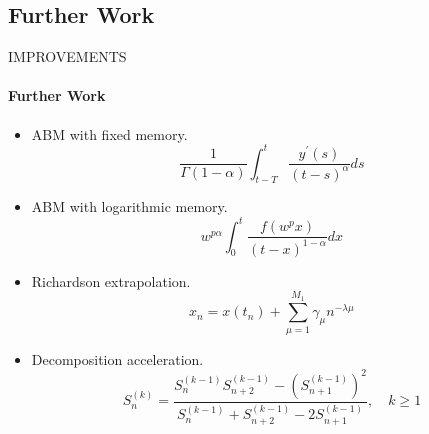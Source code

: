 \subsection{Further Work}
\begin{frame}{IMPROVEMENTS}
\framesubtitle{Further Work}
\begin{itemize}
    \item ABM with fixed memory.
    \[\frac { 1 } { \Gamma ( 1 - \alpha ) } \int _ { t - T } ^ { t } \frac { y ^ { \prime } ( s ) } { ( t - s ) ^ { \alpha } } d s\]
    \item ABM with logarithmic memory.
    \[w ^ { p \alpha } \int _ { 0 } ^ { t } \frac { f \left( w ^ { p } x \right) } { ( t - x ) ^ { 1 - \alpha } } d x\]
    \item Richardson extrapolation.
    \[x _ { n } = x \left( t _ { n } \right) + \sum _ { \mu = 1 } ^ { M _ { 1 } } \gamma _ { \mu } n ^ { - \lambda \mu }\]
    \item Decomposition acceleration.
    \[S _ { n } ^ { ( k ) } = \frac { S _ { n } ^ { ( k - 1 ) } S _ { n + 2 } ^ { ( k - 1 ) } - \left( S _ { n + 1 } ^ { ( k - 1 ) } \right) ^ { 2 } } { S _ { n } ^ { ( k - 1 ) } + S _ { n + 2 } ^ { ( k - 1 ) } - 2 S _ { n + 1 } ^ { ( k - 1 ) } } , \quad k \geq 1\]
\end{itemize}
\end{frame}


